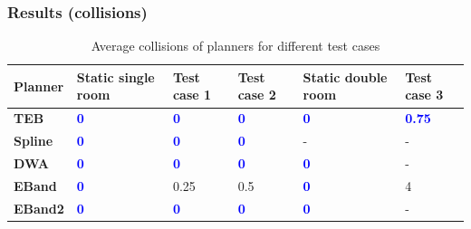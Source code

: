 \documentclass{beamer}
\begin{document}
\begin{frame}
    \frametitle{\huge{Results (collisions)}}
    \begin{table}[H]
        \centering
        \begin{tabular}{p{1.5cm}p{1.3cm}p{1.3cm}p{1.3cm}p{1.3cm}p{1.3cm}}\toprule
            \textbf{Planner} & \textbf{Static single room} & \textbf{Test case 1} & \textbf{Test case 2} & \textbf{Static double room} & \textbf{Test case 3} \\\toprule
            \textbf{TEB    } & \textcolor{blue}{\textbf{0}} & \textcolor{blue}{\textbf{0}} & \textcolor{blue}{\textbf{0}} & \textcolor{blue}{\textbf{0}} & \textcolor{blue}{\textbf{0.75}} \\\midrule
            \textbf{Spline } & \textcolor{blue}{\textbf{0}} & \textcolor{blue}{\textbf{0}} & \textcolor{blue}{\textbf{0}} & \-- & \-- \\\midrule
            \textbf{DWA    } & \textcolor{blue}{\textbf{0}} & \textcolor{blue}{\textbf{0}} & \textcolor{blue}{\textbf{0}} & \textcolor{blue}{\textbf{0}} & \-- \\\midrule
            \textbf{EBand  } & \textcolor{blue}{\textbf{0}} & 0.25 & 0.5 & \textcolor{blue}{\textbf{0}} & 4 \\\midrule
            \textbf{EBand2 } & \textcolor{blue}{\textbf{0}} & \textcolor{blue}{\textbf{0}} & \textcolor{blue}{\textbf{0}} & \textcolor{blue}{\textbf{0}} & \-- \\
            \bottomrule
        \end{tabular}
        \caption{Average collisions of planners for different test cases}
    \end{table}
\end{frame}
\end{document}
